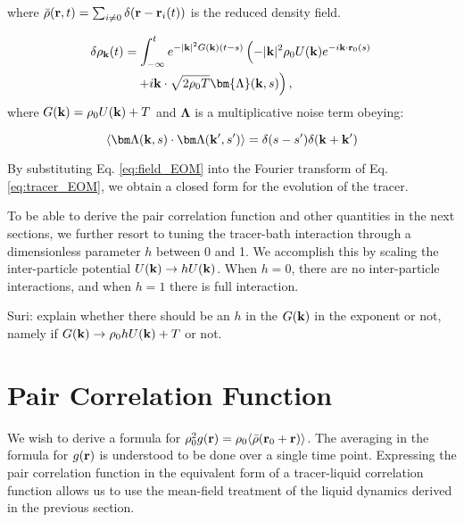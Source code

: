 \documentclass[superscriptaddress, twocolumn, prl, longbibliography, nofootinbib]{revtex4-1}
\begin{document}
where $\bar{\rho}({\bf r}, t) = \sum_{i \neq 0} \delta({\bf r} - {\bf r}_i(t))$ is the reduced density field.

\begin{equation}\label{eq:field_EOM}
	\begin{aligned}
		\delta \rho_{\bf k}(t) &= \int_{-\infty}^t e^{-|{\bf k}|^2 G({\bf k}) (t-s)} \left( -|{\bf k}|^2 \rho_0 U({\bf k}) e^{-i{\bf k} \cdot {\bf r}_0(s)} \right.
		\\
		&\left.\quad +i{\bf k} \cdot \sqrt{2\rho_0 T} \bm{\Lambda} ({\bf k}, s)\right),
	\end{aligned}
\end{equation}
where $G({\bf k}) = \rho_0 U({\bf k}) + T$ and $\bm{\Lambda}$ is a multiplicative noise term obeying:

\begin{equation}\label{eq:field_noise}
\langle {\bm \Lambda}({\bf k}, s) \cdot {\bm \Lambda}({\bf k}', s')  \rangle = \delta(s-s')\delta({\bf k} + {\bf k}')
\end{equation}

By substituting Eq. \ref{eq:field_EOM} into the Fourier transform of Eq. \ref{eq:tracer_EOM}, we obtain a closed form for the evolution of the tracer.

To be able to derive the pair correlation function and other quantities in the next sections, we further resort to tuning the tracer-bath interaction through a dimensionless parameter $h$ between 0 and 1. We accomplish this by scaling the inter-particle potential $U({\bf k}) \to h U({\bf k})$.  When $h=0$, there are no inter-particle interactions, and when $h=1$ there is full interaction.  

Suri: explain whether there should be an $h$ in the $G({\bf k})$ in the exponent or not, namely if $G({\bf k}) \to \rho_0 h U({\bf k}) + T$ or not. 

\section{Pair Correlation Function}

We wish to derive a formula for $\rho^2_0 g({\bf r}) = \rho_0 \langle \bar{\rho}({\bf r}_0 + {\bf r}) \rangle $. The averaging in the formula for $g({\bf r})$ is understood to be done over a single time point. Expressing the pair correlation function in the equivalent form of a tracer-liquid correlation function allows us to use the mean-field treatment of the liquid dynamics derived in the previous section.
\end{document}
